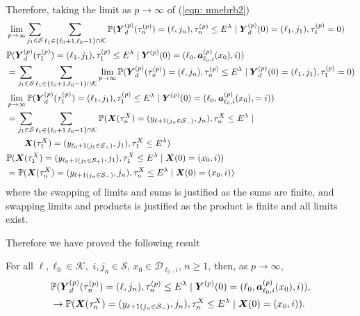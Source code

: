 Therefore, taking the limit as \(p\to \infty \) of (\ref{eqn: mnebrb2}) 
\begin{align}
	&\lim_{p\to\infty}\sum_{j_1\in\mathcal S}\sum_{\ell_1\in\{\ell_0+1,\ell_0-1\}\cap \mathcal K}\mathbb P(\boldsymbol Y_d^{(p)}(\tau_n^{(p)}) = (\ell, j_n), \tau_{n}^{(p)}\leq E^\lambda 
	 \mid \boldsymbol Y_d^{(p)}(0)=(\ell_1,j_1), 
	 \tau_1^{(p)}=0) \nonumber 
	 \\& \mathbb P(\boldsymbol Y_d^{(p)}(\tau_1^{(p)})=(\ell_1, j_1), \tau_{1}^{(p)}\leq E^\lambda
	 \mid \boldsymbol Y^{(p)}(0)=(\ell_0, \boldsymbol  a_{\ell_0,i}^{(p)}(x_0), i)) \nonumber
	 \\&= \sum_{j_1\in\mathcal S}\sum_{\ell_1\in\{\ell_0+1,\ell_0-1\}\cap \mathcal K} \lim_{p\to\infty} \mathbb P(\boldsymbol Y_d^{(p)}(\tau_n^{(p)}) = (\ell, j_n), \tau_{n}^{(p)}\leq E^\lambda 
	 \mid \boldsymbol Y_d^{(p)}(0)=(\ell_1, j_1), \tau_1^{(p)}=0) \nonumber
	 \\& \lim_{p\to\infty}\mathbb P(\boldsymbol Y_d^{(p)}(\tau_1^{(p)})=(\ell_1, j_1), \tau_{1}^{(p)}\leq E^\lambda
	 \mid \boldsymbol Y^{(p)}(0)=(\ell_0, \boldsymbol  a_{\ell_0,i}^{(p)}(x_0), =i))\nonumber
	 \\&= \sum_{j_1\in\mathcal S}\sum_{\ell_1\in\{\ell_0+1,\ell_0-1\}\cap \mathcal K} \mathbb P(\boldsymbol X(\tau_n^X) = (y_{\ell+1(j_{n}\in\mathcal S_-)}, 
		j_n), \tau_{n}^X\leq E^\lambda \mid \nonumber
		\\&\qquad{} \boldsymbol X(\tau_1^X)=(y_{\ell_{0}+1(j_{1}\in\mathcal S_+)},
		j_{1}),\tau_1^X\leq E^\lambda) \nonumber
	 \\& \mathbb P(\boldsymbol X(\tau_1^X)=(y_{\ell_{0}+1(j_{1}\in\mathcal S_+)},
		j_{1}),\tau_1^X\leq E^\lambda
		\mid \boldsymbol X(0)=(x_0, i)) \nonumber
	\\&=\mathbb P(\boldsymbol X(\tau_n^X) = (y_{\ell+1(j_{n}\in\mathcal S_-)}, 
		j_n), \tau_{n}^X\leq E^\lambda
		\mid \boldsymbol X(0)=(x_0, i))
	 \label{eqn: mnebrb22}
\end{align}
where the swapping of limits and sums is justified as the sums are finite, and swapping limits and products is justified as the product is finite and all limits exist. 

Therefore we have proved the following result 
\begin{lem}\label{lem: kKKJJJF}
	For all \(\ell,\ell_0\in\mathcal K,\) \(i,j_n\in\mathcal S\), \(x_0\in\mathcal D_{\ell_0,i}\), \(n\geq 1\), then, as \(p\to\infty\),
	\begin{align}
		&\mathbb P(\boldsymbol Y_d^{(p)}(\tau_n^{(p)}) = (\ell,j_n), \tau_{n}^{(p)}\leq E^{\lambda}
		 \mid \boldsymbol Y^{(p)}(0)=(\ell_0, \boldsymbol  a_{\ell_0,i}^{(p)}(x_0), i)),\nonumber 
		 \\&\to \mathbb P(\boldsymbol X(\tau_n^X) = (y_{\ell+1(j_{n}\in\mathcal S_-)}, 
		j_n), \tau_{n}^X\leq E^\lambda
		\mid \boldsymbol X(0)=(x_0, i)).
	\end{align}
\end{lem} 

